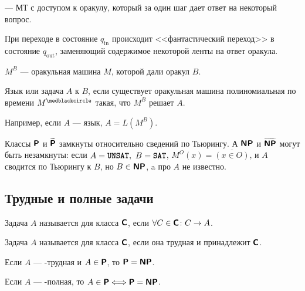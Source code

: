 \begin{defn}[Оракульная МТ]
	 --- МТ с доступом к оракулу, который за один шаг дает ответ на некоторый вопрос.
\end{defn}
\begin{name}
	При переходе в состояние $ q_{\text{in}}$ происходит <<фантастический переход>> в состояние $ q_{\text{out}}$, заменяющий содержимое некоторой ленты на ответ оракула.

	\noindent$ M^{B}$ --- оракульная машина $ M$, которой дали оракул $ B$. 
\end{name}

\begin{defn}
	Язык или задача $ A$  к $ B$, если существует оракульная машина полиномиальная по времени $ M^{\medblackcircle}$ такая, что $ M^{B}$ решает $ A$.

	\noindent
	Например, если  $ A$ ---  язык, $ A = L(M^{B})$.
\end{defn}
\begin{ex}
	Классы $\P$ и $\tP$ замкнуты относительно сведений по Тьюрингу. А $\NP$ и $\tNP$ могут быть незамкнуты: если $A = \UNSAT,~ B = \SAT$, $ M^{O}(x) = \overline{(x \in O)}$, и $ A$ сводится по Тьюрингу к $ B$, но $ B \in \NP$, a про $ A$ не известно.
\end{ex}

\subsection{Трудные и полные задачи}
\begin{defn}
	Задача $ A$ называется  для класса $\Class$, если  $ \forall C \in \Class \colon C \to A$.

	\noindent
	Задача $ A$ называется  для класса $ \Class$, если она трудная и принадлежит $ \Class$.
\end{defn}

\begin{thm}
    Если $ A$ --- \NP-трудная и $ A \in \P$, то $ \P = \NP$.
\end{thm}
\begin{cor}
    Если $ A$ --- \NP-полная, то $
    A \in \P \Longleftrightarrow \P = \NP
    $. 
\end{cor}

